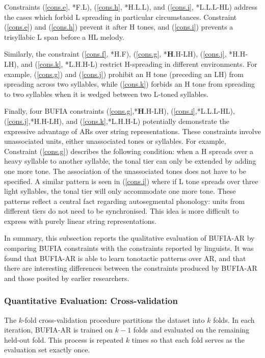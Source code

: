 \documentclass{CUP-JNL-PHO}%
\theoremstyle{definition}
\numberwithin{equation}{section}
\theoremstyle{definition}
\newcommand{\kuo}[1]{(\ref{#1})}
\begin{document}
Constraints (\ref{cons.e}, *F.L), (\ref{cons.h}, *H.L.L), and (\ref{cons.i}, 
*L.L.L-HL) address the cases which forbid L spreading in particular 
circumstances. Constraint \kuo{cons.e} and \kuo{cons.h} prevent it after H 
tones, and \kuo{cons.i} prevents a trisyllabic L span before a HL melody.

Similarly, the constraint (\ref{cons.f}, *H.F), (\ref {cons.g}, *\textbf{H}.H-LH), 
(\ref{cons.j}, *H.H-LH), and (\ref{cons.k}, *L.H.H-L) restrict H-spreading 
in different environments. For example, \kuo{cons.g} and \kuo{cons.j} prohibit 
an H tone (preceding an LH) from spreading across two syllables, while 
\kuo{cons.k} forbids an H tone from spreading to two syllables when it is 
wedged between two L-toned syllables.

Finally, four BUFIA constraints (\ref{cons.g},*\textbf{H}.H-LH), 
(\ref{cons.i},*L.L.L-HL), (\ref{cons.j},*H.H-LH), and (\ref{cons.k},*L.H.H-L)
potentially demonstrate the expressive advantage of ARs over string
representations. These constraints involve unassociated units, either
unassociated tones or syllables. For example, Constraint
\kuo{cons.g} describes the following condition: when a H spreads over a heavy
syllable to another syllable, the tonal tier can only be extended by
adding one more tone. The association of the unassociated tones does not
have to be specified. A similar pattern is seen in \kuo{cons.i} where
if L tone spreads over three light syllables, the tonal tier will only
accommodate one more tone. These patterns reflect a central fact
regarding autosegmental phonology: units from different tiers do not
need to be synchronised. This idea is more difficult to express with
purely linear string representations.

In summary, this subsection reports the qualitative evaluation of 
BUFIA-AR by comparing BUFIA constraints with the constraints reported
by linguists. It was found that BUFIA-AR is able to learn tonotactic
patterns over AR, and that there are interesting differences between
the constraints produced by BUFIA-AR and those posited by earlier
researchers.


\subsubsection{Quantitative Evaluation: Cross-validation}

The $k$-fold cross-validation procedure partitions the dataset into 
$k$ folds. In each iteration, BUFIA-AR is trained on $k-1$ folds 
and evaluated on the remaining held-out fold. This process is 
repeated $k$ times so that each fold serves as the evaluation 
set exactly once.
\end{document}
